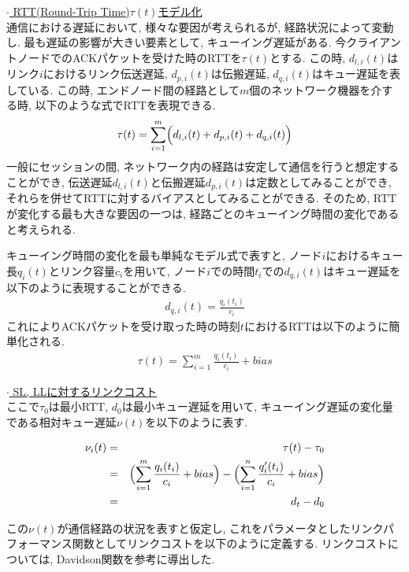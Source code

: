 \underline{$\cdot$ RTT(Round-Trip Time)$\tau(t)$モデル化} \\
通信における遅延において, 様々な要因が考えられるが, 経路状況によって変動し. 最も遅延の影響が大きい要素として,
キューイング遅延がある\cite{RTT_est, queue_delay}.
今クライアントノードでのACKパケットを受けた時のRTTを$\tau(t)$とする. 
この時, $d_{l, i}(t)$はリンク$i$におけるリンク伝送遅延, $d_{p, i}(t)$は伝搬遅延, $d_{q,
i}(t)$はキュー遅延を表している. 
この時, エンドノード間の経路として$m$個のネットワーク機器を介する時, 以下のような式でRTTを表現できる. 
\begin{eqnarray}
\tau(t) = \sum ^m _{i=1} \Bigl(d_{l, i}(t) + d_{p, i}(t) + d_{q, i}(t)  \Bigr)
\end{eqnarray}
一般にセッションの間, ネットワーク内の経路は安定して通信を行うと想定することができ, 伝送遅延$d_{l, i}(t)$と伝搬遅延$d_{p,
i}(t)$は定数としてみることができ, それらを併せてRTTに対するバイアスとしてみることができる\cite{RTT_est}. 
そのため, RTTが変化する最も大きな要因の一つは, 経路ごとのキューイング時間の変化であると考えられる. 

キューイング時間の変化を最も単純なモデル式で表すと, ノード$i$におけるキュー長$q_i(t)$とリンク容量$c_i$を用いて,
ノード$i$での時間$t_i$での$d_{q,i}(t)$はキュー遅延を以下のように表現することができる. 
\begin{eqnarray}
d_{q,i}(t) = \frac{q_i(t_i)}{c_i}
\end{eqnarray}
これによりACKパケットを受け取った時の時刻$t$におけるRTTは以下のように簡単化される. 
\begin{eqnarray}
\tau(t) = \sum ^m _{i=1} \frac{q_i(t_i)}{c_i} + bias
\end{eqnarray}

\underline{$\cdot$ SL, LLに対するリンクコスト} \\
ここで$\tau_0$は最小RTT, $d_0$は最小キュー遅延を用いて, キューイング遅延の変化量である相対キュー遅延$\nu(t)$を以下のように表す. 
\begin{center}
\begin{eqnarray}
\nu_{i}(t) &=& \tau(t) - \tau_0 \\
&=& \Bigl( \sum ^m _{i=1} \frac{q_i(t_i)}{c_i} + bias \Bigr) - \Bigl( \sum
^n_{i=1} \frac{q'_i(t_i)}{c_i} + bias \Bigr) \\
&=& d_t -d_0
\end{eqnarray}
\end{center}
この$\nu(t)$が通信経路の状況を表すと仮定し,
これをパラメータとしたリンクパフォーマンス関数\cite{bpr}としてリンクコストを以下のように定義する.
リンクコストについては, Davidson関数を参考に導出した\cite{bpr, davidson}.

